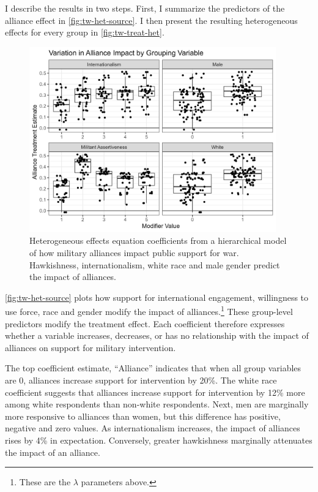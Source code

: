 \documentclass[12pt]{article}
\begin{document}
I describe the results in two steps. 
First, I summarize the predictors of the alliance effect in \autoref{fig:tw-het-source}.
I then present the resulting heterogeneous effects for every group in \autoref{fig:tw-treat-het}.


\begin{figure}[htpb]
	\centering
		\includegraphics[width=0.95\textwidth]{../figures/tw-het-source.png}
	\caption{Heterogeneous effects equation coefficients from a hierarchical model of how military alliances impact public support for war. Hawkishness, internationalism, white race and male gender predict the impact of alliances.}
	\label{fig:tw-het-source}
\end{figure}


\autoref{fig:tw-het-source} plots how support for international engagement, willingness to use force, race and gender modify the impact of alliances.\footnote{These are the $\lambda$ parameters above.}
These group-level predictors modify the treatment effect.
Each coefficient therefore expresses whether a variable increases, decreases, or has no relationship with the impact of alliances on support for military intervention.  


The top coefficient estimate, ``Alliance'' indicates that when all group variables are 0, alliances increase support for intervention by 20\%. 
The white race coefficient suggests that alliances increase support for intervention by 12\% more among white respondents than non-white respondents. 
Next, men are marginally more responsive to alliances than women, but this difference has positive, negative and zero values.  
As internationalism increases, the impact of alliances rises by 4\% in expectation.
Conversely, greater hawkishness marginally attenuates the impact of an alliance. 
\end{document}
